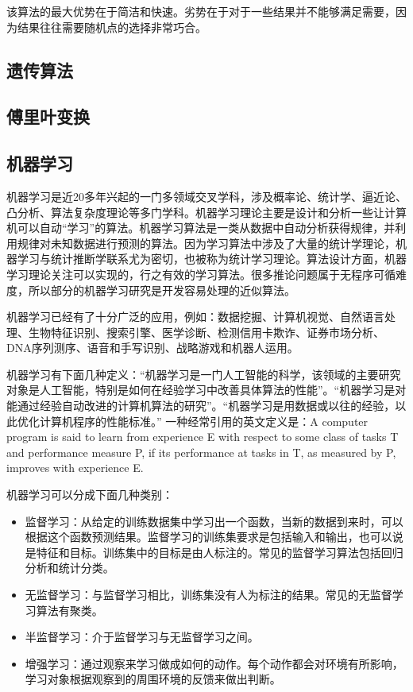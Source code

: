 \documentclass[11pt,a4paper,twoside]{book}
\begin{document}
该算法的最大优势在于简洁和快速。劣势在于对于一些结果并不能够满足需要，因为结果往往需要随机点的选择非常巧合。

\subsection{遗传算法}

\subsection{傅里叶变换}

\subsection{机器学习}
机器学习是近20多年兴起的一门多领域交叉学科，涉及概率论、统计学、逼近论、凸分析、算法复杂度理论等多门学科。机器学习理论主要是设计和分析一些让计算机可以自动“学习”的算法。机器学习算法是一类从数据中自动分析获得规律，并利用规律对未知数据进行预测的算法。因为学习算法中涉及了大量的统计学理论，机器学习与统计推断学联系尤为密切，也被称为统计学习理论。算法设计方面，机器学习理论关注可以实现的，行之有效的学习算法。很多推论问题属于无程序可循难度，所以部分的机器学习研究是开发容易处理的近似算法。

机器学习已经有了十分广泛的应用，例如：数据挖掘、计算机视觉、自然语言处理、生物特征识别、搜索引擎、医学诊断、检测信用卡欺诈、证券市场分析、DNA序列测序、语音和手写识别、战略游戏和机器人运用。

机器学习有下面几种定义：“机器学习是一门人工智能的科学，该领域的主要研究对象是人工智能，特别是如何在经验学习中改善具体算法的性能”。“机器学习是对能通过经验自动改进的计算机算法的研究”。“机器学习是用数据或以往的经验，以此优化计算机程序的性能标准。” 一种经常引用的英文定义是：A computer program is said to learn from experience E with respect to some class of tasks T and performance measure P, if its performance at tasks in T, as measured by P, improves with experience E.

机器学习可以分成下面几种类别：

\begin{itemize}
  \item 监督学习：从给定的训练数据集中学习出一个函数，当新的数据到来时，可以根据这个函数预测结果。监督学习的训练集要求是包括输入和输出，也可以说是特征和目标。训练集中的目标是由人标注的。常见的监督学习算法包括回归分析和统计分类。
  \item 无监督学习：与监督学习相比，训练集没有人为标注的结果。常见的无监督学习算法有聚类。
  \item 半监督学习：介于监督学习与无监督学习之间。
  \item 增强学习：通过观察来学习做成如何的动作。每个动作都会对环境有所影响，学习对象根据观察到的周围环境的反馈来做出判断。
\end{itemize}
\end{document}
